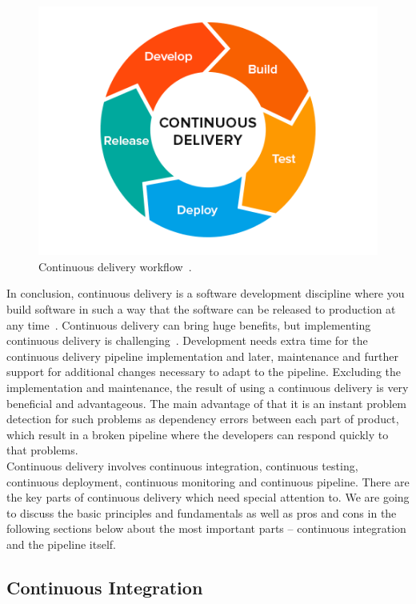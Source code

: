 \documentclass[12pt,a4paper]{article}
\theoremstyle{definition}
\begin{document}
    \begin{figure}[H]
        \centering
        \includegraphics[scale=0.5]{img/cd.png}
        \caption{Continuous delivery workflow~\cite{cd1}.}
        \label{fig:cd}
    \end{figure}

    In conclusion, continuous delivery is a software development discipline where you build software in such a way that the software can be released to production at any time~\cite{cd2}. Continuous delivery can bring huge benefits, but implementing continuous delivery is challenging~\cite{8452107}. Development needs extra time for the continuous delivery pipeline implementation and later, maintenance and further support for additional changes necessary to adapt to the pipeline. Excluding the implementation and maintenance, the result of using a continuous delivery is very beneficial and advantageous. The main advantage of that it is an instant problem detection for such problems as dependency errors between each part of product, which result in a broken pipeline where the developers can respond quickly to that problems.\\

    Continuous delivery involves continuous integration, continuous testing, continuous deployment, continuous monitoring and continuous pipeline. There are the key parts of continuous delivery which need special attention to. We are going to discuss the basic principles and fundamentals as well as pros and cons in the following sections below about the most important parts -- continuous integration and the pipeline itself.

    \subsection{Continuous Integration}\label{sec:CI}
\end{document}

